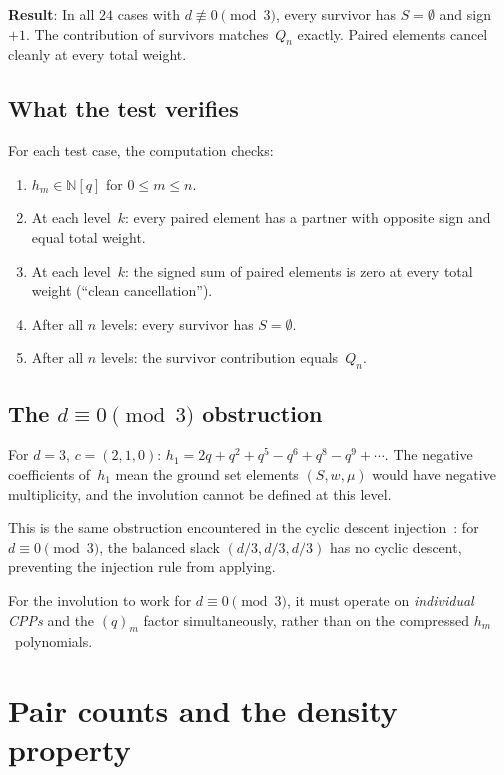 \documentclass[11pt]{article}
\newcommand{\N}{\mathbb{N}}
\theoremstyle{plain}
\theoremstyle{definition}
\begin{document}
\medskip\noindent
\textbf{Result}: In all $24$ cases with $d \not\equiv 0
\pmod{3}$, every survivor has $S = \emptyset$ and
sign~$+1$.  The contribution of survivors matches~$Q_n$
exactly.  Paired elements cancel cleanly at every
total weight.


\subsection{What the test verifies}

For each test case, the computation checks:
\begin{enumerate}
  \item $h_m \in \N[q]$ for $0 \leq m \leq n$.
  \item At each level~$k$: every paired element has a
    partner with opposite sign and equal total weight.
  \item At each level~$k$: the signed sum of paired
    elements is zero at every total weight
    (``clean cancellation'').
  \item After all $n$ levels: every survivor has
    $S = \emptyset$.
  \item After all $n$ levels: the survivor contribution
    equals~$Q_n$.
\end{enumerate}


\subsection{The $d \equiv 0 \pmod{3}$ obstruction}

For $d = 3$, $c = (2,1,0)$: $h_1 = 2q + q^2 + q^5
- q^6 + q^8 - q^9 + \cdots$.  The negative coefficients
of~$h_1$ mean the ground set elements $(S, w, \mu)$
would have negative multiplicity, and the involution
cannot be defined at this level.

This is the same obstruction encountered in the cyclic
descent injection~\cite{LOCAL_RULE}: for $d \equiv 0
\pmod{3}$, the balanced slack $(d/3, d/3, d/3)$ has no
cyclic descent, preventing the injection rule from
applying.

For the involution to work for $d \equiv 0 \pmod{3}$,
it must operate on \emph{individual CPPs} and the
$(q)_m$ factor simultaneously, rather than on the
compressed $h_m$~polynomials.


\section{Pair counts and the density property}
\label{sec:pair-counts}
\end{document}
